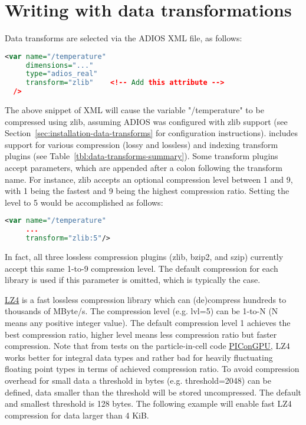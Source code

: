 \section{Writing with data transformations}
Data transforms are selected via the ADIOS XML file, as follows:

\begin{lstlisting}[language=XML]
<var name="/temperature"
     dimensions="..."
     type="adios_real"
     transform="zlib"    <!-- Add this attribute -->
  />
\end{lstlisting}

The above snippet of XML will cause the variable "/temperature" to be compressed using zlib, assuming ADIOS was configured with zlib support
(see Section~\ref{sec:installation-data-transforms} for configuration instructions). \adiosversion includes support for 
various compression (lossy and lossless) and indexing transform plugins (see Table~\ref{tbl:data-transforms-summary}).
Some transform plugins accept parameters, which are appended after a colon following the transform name.
For instance, zlib accepts an optional compression level between 1 and 9, with 1 being the fastest and
9 being the highest compression ratio. Setting the level to 5 would be accomplished as follows:

\begin{lstlisting}[language=XML]
<var name="/temperature"
     ...
     transform="zlib:5"/>
\end{lstlisting}

In fact, all three lossless compression plugins (zlib, bzip2, and szip) currently accept this same
1-to-9 compression level. The default compression for each library is used if this parameter is
omitted, which is typically the case.


\href{https://github.com/lz4/lz4}{LZ4} is a fast lossless compression library which can (de)compress hundreds to thousands of MByte/s.
The compression level (e.g. lvl=5) can be 1-to-N (N means any positive integer value). 
The default compression level 1 achieves the best compression ratio, higher level means less compression ratio but faster compression.
Note that from tests on the particle-in-cell code \href{http://picongpu.hzdr.de}{PIConGPU}, LZ4 works better for integral data types and rather bad for heavily fluctuating floating point types in terms of achieved compression ratio.
To avoid compression overhead for small data a threshold in bytes (e.g. threshold=2048) can be defined, data smaller than the threshold will be stored uncompressed.
The default and smallest threshold is 128 bytes.
The following example will enable fast LZ4 compression for data larger than 4 KiB.

